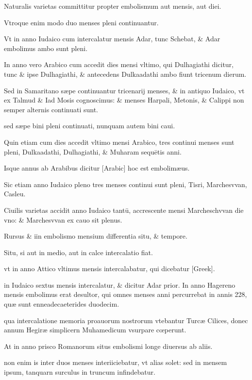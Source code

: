 \begin{parnumbers}

Naturalis varietas committitur propter embolismum  aut mensis, aut diei.

Vtroque enim modo duo menses pleni continuantur.

Vt in anno Iudaico cum intercalatur mensis Adar, tunc
Schebat, \& Adar embolimus ambo sunt pleni.

In anno vero Arabico cum accedit dies mensi vltimo, qui Dulhagiathi dicitur, tunc \& ipse Dulhagiathi, \& antecedens Dulkaadathi ambo fiunt tricenum dierum.

Sed in Samaritano sæpe continuantur tricenarij menses, \& in antiquo Iudaico, vt ex Talmud \& Iad Mosis cognoscimus: \& menses Harpali, Metonis, \& Calippi non semper alternis continuati sunt.

sed sæpe bini pleni continuati, nunquam autem bini caui.

Quin etiam cum dies accedit vltimo mensi Arabico, tres continui menses sunt pleni, Dulkaadathi, Dulhagiathi, \& Muharam sequētis anni.

Isque annus ab Arabibus dicitur \textarabic{[Arabic]} hoc est embolimæus.

Sic etiam anno Iudaico pleno tres menses continui sunt pleni, Tisri, Marchesvvan, Casleu.

Ciuilis varietas accidit anno Iudaico tantū, accrescente mensi Marcheschvvan die vno: \& Marchesvvan ex cauo sit plenus.

Rursus \& iin embolismo mensium differentia situ, \& tempore.

Situ, si aut in medio, aut in calce intercalatio fiat.

vt in anno Attico vltimus mensis intercalabatur, qui dicebatur \textgreek{[Greek]}.

in Iudaico sextus mensis intercalatur, \& dicitur Adar prior. In anno Hagereno mensis embolimus erat desultor, qui omnes menses anni percurrebat in annis 228, quæ sunt enneadecaeterides duodecim.

qua intercalatione memoria proauorum nostrorum vtebantur Turcæ Cilices, donec annum Hegiræ simplicern  Muhamedicum vsurpare cœperunt.

At in anno prisco Romanorum situs embolismi longe diuersus ab aliis.

non enim is inter duos menses interiiciebatur, vt alias solet: sed in mensem ipsum, tanquarn surculus in truncum infindebatur.


\end{parnumbers}
